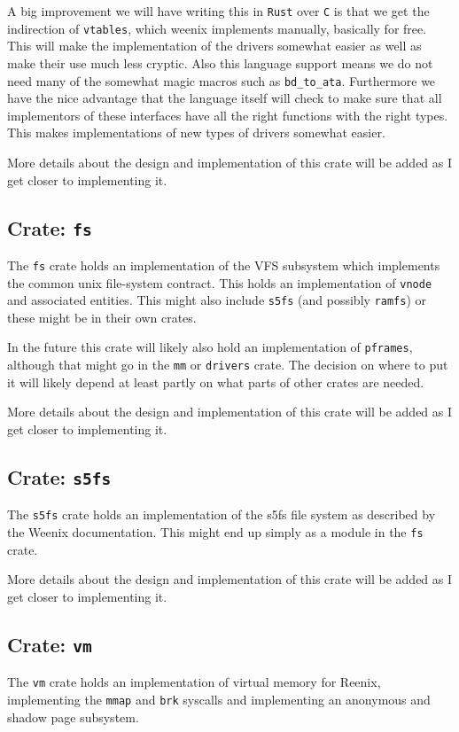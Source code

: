 \documentclass[12pt,letterpaper]{article}
\newcommand{\rust}{\texttt{Rust}}
\begin{document}
A big improvement we will have writing this in \rust{} over \texttt{C} is
that we get the indirection of \texttt{vtables}, which weenix implements
manually, basically for free. This will make the implementation of the
drivers somewhat easier as well as make their use much less cryptic. Also
this language support means we do not need many of the somewhat magic
macros such as \texttt{bd\_to\_ata}. Furthermore we have the nice
advantage that the language itself will check to make sure that all
implementors of these interfaces have all the right functions with
the right types. This makes implementations of new types of drivers
somewhat easier.

More details about the design and implementation of this crate will be
added as I get closer to implementing it.

\subsection{Crate: \texttt{fs}}
The \texttt{fs} crate holds an implementation of the VFS subsystem
which implements the common unix file-system contract. This holds an
implementation of \texttt{vnode} and associated entities. This might
also include \texttt{s5fs} (and possibly \texttt{ramfs}) or these might
be in their own crates.

In the future this crate will likely also hold an implementation
of \texttt{pframes}, although that might go in the \texttt{mm} or
\texttt{drivers} crate. The decision on where to put it will likely
depend at least partly on what parts of other crates are needed.

More details about the design and implementation of this crate will be
added as I get closer to implementing it.

\subsection{Crate: \texttt{s5fs}}
The \texttt{s5fs} crate holds an implementation of the s5fs file system
as described by the Weenix documentation. This might end up simply as a
module in the \texttt{fs} crate.

More details about the design and implementation of this crate will be
added as I get closer to implementing it.

\subsection{Crate: \texttt{vm}}
The \texttt{vm} crate holds an implementation of virtual memory for
Reenix, implementing the \texttt{mmap} and \texttt{brk} syscalls and
implementing an anonymous and shadow page subsystem.
\end{document}
